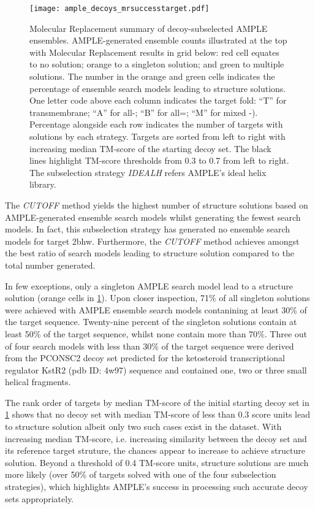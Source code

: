 \begin{figure}[H]
    \centering
    \texttt{[image: ample\_decoys\_mrsuccesstarget.pdf]}
\caption[Molecular Replacement summary of decoy-subselected AMPLE ensembles]{Molecular Replacement summary of decoy-subselected AMPLE ensembles. AMPLE-generated ensemble counts illustrated at the top with Molecular Replacement results in grid below: red cell equates to no solution; orange to a singleton solution; and green to multiple solutions. The number in the orange and green cells indicates the percentage of ensemble search models leading to structure solutions. One letter code above each column indicates the target fold: ``T'' for transmembrane; ``A'' for all-\textalpha; ``B'' for all=\textbeta; ``M'' for mixed \textalpha-\textbeta). Percentage alongside each row indicates the number of targets with solutions by each strategy. Targets are sorted from left to right with increasing median TM-score of the starting decoy set. The black lines highlight TM-score thresholds from 0.3 to 0.7 from left to right. The subselection strategy \textit{IDEALH} refers AMPLE's ideal helix library.}
    \label{fig:ample_decoys_mrsuccesstarget}
\end{figure}

The \textit{CUTOFF} method yields the highest number of structure solutions based on AMPLE-generated ensemble search models whilst generating the fewest search models. In fact, this subselection strategy has generated no ensemble search models for target 2bhw. Furthermore, the \textit{CUTOFF} method achieves amongst the best ratio of search models leading to structure solution compared to the total number generated. 

In few exceptions, only a singleton AMPLE search model lead to a structure solution (orange cells in \cref{fig:ample_decoys_mrsuccesstarget}). Upon closer inspection, 71\% of all singleton solutions were achieved with AMPLE ensemble search models contanining at least 30\% of the target sequence. Twenty-nine percent of the singleton solutions contain at least 50\% of the target sequence, whilst none contain more than 70\%. Three out of four search models with less than 30\% of the target sequence were derived from the PCONSC2 decoy set predicted for the ketosteroid transcriptional regulator KstR2 (\gls{pdb} ID: 4w97) sequence and contained one, two or three small helical fragments.  

The rank order of targets by median TM-score of the initial starting decoy set in \cref{fig:ample_decoys_mrsuccesstarget} shows that no decoy set with median TM-score of less than 0.3 score units lead to structure solution albeit only two such cases exist in the dataset. With increasing median TM-score, i.e. increasing similarity between the decoy set and its reference target struture, the chances appear to increase to achieve structure solution. Beyond a threshold of 0.4 TM-score units, structure solutions are much more likely (over 50\% of targets solved with one of the four subselection strategies), which highlights AMPLE's success in processing such accurate decoy sets appropriately.

